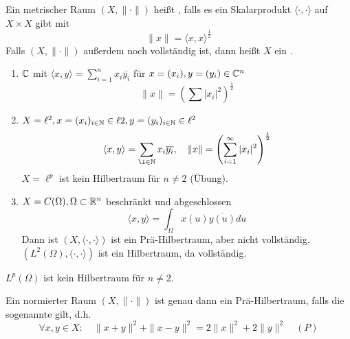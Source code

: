 \begin{definition}
	Ein metrischer Raum $(X, \| \cdot \|)$ hei{\ss}t , falls es ein Skalarprodukt $\langle \cdot, \cdot \rangle$ auf $X \times X$ gibt mit
		\[ \| x \| = \langle x, x \rangle^{\frac{1}{2}} \]
	Falls $(X, \| \cdot \|)$ au{\ss}erdem noch vollständig ist, dann hei{\ss}t $X$ ein .	
\end{definition}


\begin{beispiel}
	\begin{enumerate}[label=\alph*\upshape)]
		\item $\mathbb{C}$ mit $\langle x, y \rangle = \sum_{i = 1}^{n} x_{i} \overline{y_{i}}$ für $x = (x_{i}), y = (y_{i}) \in \mathbb{C}^{n}$ \\
			\[ \| x \| = \left( \sum | x_{i}|^{2} \right)^{\frac{1}{2}} \]
		\item $X = \ell^{2}, x = (x_{i})_{i \in \mathbb{N}} \in \ell{2}, y = (y_{i})_{i \in \mathbb{N}} \in \ell^{2}$ \\
			\[ \langle x, y \rangle = \sum_{\i \in \MdN} x_{i} \overline{y_{i}},  \quad \|x \| = \left( \sum_{i = 1}^{\infty} |x_{i}|^{2} \right)^{\frac{1}{2}} \]
			$X = \ell^{p}$ ist kein Hilbertraum für $n \neq 2$ (Übung).
		\item $X = C(\Omega), \Omega \subset \mathbb{R}^{n}$ beschränkt und abgeschlossen \\
			\[ \langle x, y \rangle = \int_{\Omega} x(u) \overline{y(u)} du \]
			Dann ist $(X, \langle \cdot, \cdot \rangle)$ ist ein Prä-Hilbertraum, aber nicht vollständig. \\
			$(L^{2}(\Omega), \langle \cdot, \cdot \rangle)$ ist ein Hilbertraum, da vollständig.
	\end{enumerate}	
\end{beispiel}


\begin{bemerkung*}
	$L^{p}(\Omega)$ ist kein Hilbertraum für $n \neq 2$.
\end{bemerkung*}


\begin{satz} \label{satz:15.6}
	Ein normierter Raum $(X, \| \cdot \|)$ ist genau dann ein Prä-Hilbertraum, falls die sogenannte  gilt, d.h.
	\[ \forall x, y \in X: \quad \|x + y \|^{2} + \| x - y \|^{2} = 2 \| x \|^{2} + 2 \| y \|^{2} \quad (P) \label{eq:15.6-rallelogrammGleichung} \]
\end{satz}

